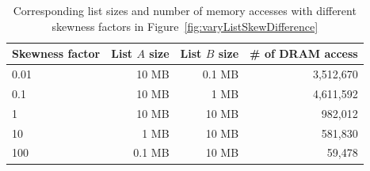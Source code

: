\begin{table}[tbp]\small
\centering
\begin{tabular}{l|r|r|r}\hline\hline
\textbf{Skewness factor} & \textbf{List $A$ size} & \textbf{List $B$ size} & \textbf{\# of DRAM access}\\\hline
0.01 & 10 MB & 0.1 MB &3,512,670\\\hline
0.1 & 10 MB & 1 MB&4,611,592\\\hline
1 & 10 MB & 10 MB&982,012\\\hline
10 & 1 MB & 10 MB& 581,830\\\hline
100 & 0.1 MB & 10 MB&59,478\\\hline\hline
\end{tabular}
\caption{Corresponding list sizes and number of memory accesses with different skewness factors in Figure~\ref{fig:varyListSkewDifference}}\label{tab:skewFactorDifference}
\end{table}










